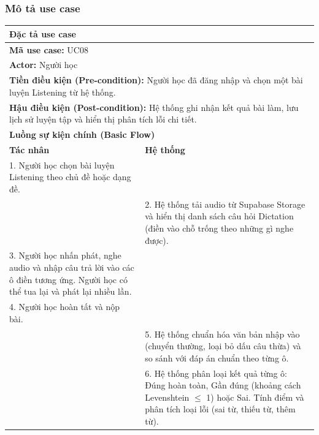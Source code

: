 \documentclass[a4paper,12pt]{extreport}
\begin{document}
\subsubsection{Mô tả use case}
\begin{table}[!ht]
    \centering
    \renewcommand{\arraystretch}{1.1}
    \begin{tabularx}{\linewidth}{|X|X|}
        \hline
        \multicolumn{2}{|l|}{\textbf{Đặc tả use case}} \\ \hline
        \multicolumn{2}{|l|}{\textbf{Mã use case:} UC08} \\ \hline
        \multicolumn{2}{|l|}{\textbf{Actor:} Người học} \\ \hline
        \multicolumn{2}{|p{\dimexpr\linewidth-2\tabcolsep-2\arrayrulewidth}|}{\textbf{Tiền điều kiện (Pre-condition):} Người học đã đăng nhập và chọn một bài luyện Listening từ hệ thống.} \\ \hline
        \multicolumn{2}{|p{\dimexpr\linewidth-2\tabcolsep-2\arrayrulewidth}|}{\textbf{Hậu điều kiện (Post-condition):} Hệ thống ghi nhận kết quả bài làm, lưu lịch sử luyện tập và hiển thị phân tích lỗi chi tiết.} \\ \hline
        \multicolumn{2}{|l|}{\textbf{Luồng sự kiện chính (Basic Flow)}} \\ \hline
        \textbf{Tác nhân} & \textbf{Hệ thống} \\ \hline

        1. Người học chọn bài luyện Listening theo chủ đề hoặc dạng đề. & \\ \hline

        & 2. Hệ thống tải audio từ Supabase Storage và hiển thị danh sách câu hỏi Dictation (điền vào chỗ trống theo những gì nghe được). \\ \hline

        3. Người học nhấn phát, nghe audio và nhập câu trả lời vào các ô điền tương ứng. Người học có thể tua lại và phát lại nhiều lần. & \\ \hline

        4. Người học hoàn tất và nộp bài. & \\ \hline

        & 5. Hệ thống chuẩn hóa văn bản nhập vào (chuyển thường, loại bỏ dấu câu thừa) và so sánh với đáp án chuẩn theo từng ô. \\ \hline

        & 6. Hệ thống phân loại kết quả từng ô: Đúng hoàn toàn, Gần đúng (khoảng cách Levenshtein $\leq$ 1) hoặc Sai. Tính điểm và phân tích loại lỗi (sai từ, thiếu từ, thêm từ). \\ \hline


\end{tabularx}
\end{table}
\end{document}
